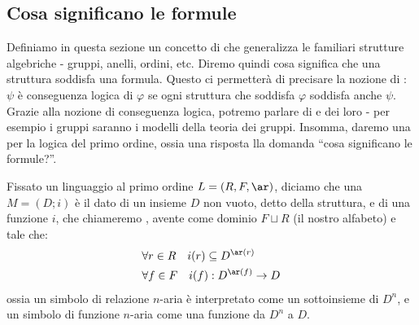 \subsection{Cosa significano le formule}
Definiamo in questa sezione un concetto di  che generalizza le familiari strutture algebriche - gruppi, anelli, ordini, etc.
Diremo quindi cosa significa che una struttura soddisfa una formula. Questo ci permetterà di precisare la nozione di :
$\psi$ è conseguenza logica di $\varphi$ se ogni struttura che soddisfa $\varphi$ soddisfa anche $\psi$. Grazie alla nozione di conseguenza logica, potremo parlare 
di  e dei loro  - per esempio i gruppi saranno i modelli della teoria dei gruppi.
Insomma, daremo una  per la logica del primo ordine, ossia una risposta lla domanda ``cosa significano le formule?''.

\begin{definition}
    [$L$-struttura]
    Fissato un linguaggio al primo ordine $L = (R,F,\ar)$, diciamo che una  $M = (D;i)$ è il dato di un insieme $D$ non vuoto, detto 
     della struttura, e di una funzione $i$, che chiameremo , avente come dominio $F \sqcup R$ (il nostro alfabeto) e tale che:
    \begin{align*}
        &\forall r \in  R \quad i(r) \subseteq D^{\ar(r)} \\
        &\forall f \in F \quad i(f) : D^{\ar(f)} \to D
    \end{align*}
    ossia un simbolo di relazione $n$-aria è interpretato come un sottoinsieme di $D^n$, e un simbolo di funzione $n$-aria come una funzione da $D^n$ a $D$.
\end{definition}

